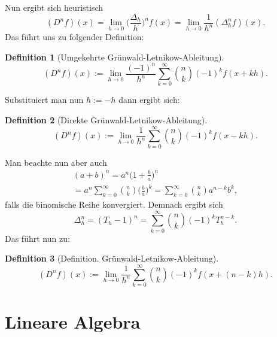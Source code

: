 \documentclass[a4paper,10pt,fleqn,twocolumn,twoside,dvipdfmx]{scrartcl}
\numberwithin{equation}{section}
\theoremstyle{rmbox}
\newtheorem{definition}{Definition}
\begin{document}
Nun ergibt sich heuristisch
\begin{equation}
(D^n f)(x) = \lim_{h\to 0} \bigg(\frac{\Delta_h}{h}\bigg)^n f(x)
= \lim_{h\to 0}\frac{1}{h^n} (\Delta_h^n f)(x).
\end{equation}
Das führt uns zu folgender Definition:
\begin{definition}[Umgekehrte Grünwald-Letnikow-Ableitung]
\begin{equation}
(D^n f)(x) := \lim_{h\to 0}
\frac{(-1)^n}{h^n} \sum_{k=0}^\infty \binom{n}{k} (-1)^k f(x+kh).
\end{equation}
\end{definition}
Substituiert man nun $h:=-h$ dann ergibt sich:
\begin{definition}[Direkte Grünwald-Letnikow-Ableitung]
\begin{equation}
(D^n f)(x) := \lim_{h\to 0}
\frac{1}{h^n} \sum_{k=0}^\infty \binom{n}{k} (-1)^k f(x-kh).
\end{equation}
\end{definition}
Man beachte nun aber auch
\begin{gather}
(a+b)^n = a^n \bigg(1+\frac{b}{a}\bigg)^n\\
= a^n\sum_{k=0}^\infty \binom{n}{k}\bigg(\frac{b}{a}\bigg)^k
= \sum_{k=0}^\infty \binom{n}{k} a^{n-k}b^k,
\end{gather}
falls die binomische Reihe konvergiert. Demnach ergibt sich%
\begin{equation}
\Delta_h^n = (T_h-1)^n = \sum_{k=0}^\infty \binom{n}{k}(-1)^k T_h^{n-k}.
\end{equation}
Das führt nun zu:
\begin{definition}[Definition. Grünwald-Letnikow-Ableitung]
\begin{equation}
(D^n f)(x) := \lim_{h\to 0}
\frac{1}{h^n} \sum_{k=0}^\infty \binom{n}{k} (-1)^k f(x+(n-k)h).
\end{equation}
\end{definition}

\section{Lineare Algebra}
\end{document}
